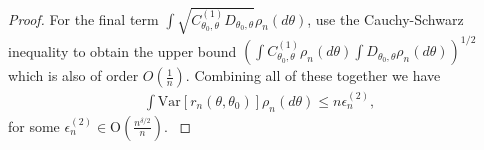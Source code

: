 \documentclass[11pt]{amsart}
\newcommand{\E}{\mathrm{E}}
\newcommand{\Var}{\mathrm{Var}}
\newcommand{\Cov}{\mathrm{Cov}}
\newcommand{\loglik}{r_n(\theta,\theta_0)}
\begin{document}
\begin{proof}
For the final term $\int \sqrt{C_{\theta_0,\theta}^{(1)}D_{\theta_0,\theta}}\rho_n (d\theta)$, use the Cauchy-Schwarz inequality to obtain the upper bound $\left(\int {C_{\theta_0,\theta}^{(1)}\rho_n (d\theta) \int D_{\theta_0,\theta}}\rho_n (d\theta)\right)^{1/2}$ which is also of order $O(\frac{1}{n})$.
Combining all of these together we have
\begin{align*}
    \int \Var[\loglik] \rho_n (d\theta) \leq n \epsilon^{(2)}_n, 
\end{align*}
for some $\epsilon^{(2)}_n\in \mathrm{O}(\frac{n^{\delta/2}}{n})$.
{
}
\end{proof}
\end{document}
